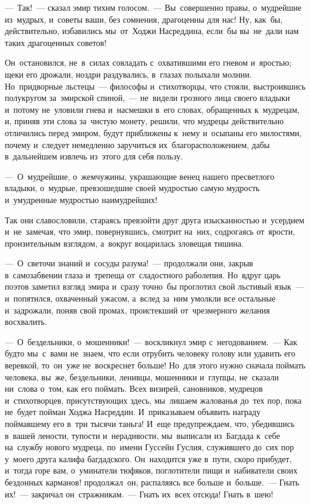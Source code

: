 \documentclass[12pt,a4paper]{book}
\begin{document}
—~Так!~— сказал эмир тихим голосом.~— Вы~совершенно правы, о~мудрейшие из~мудрых, и~советы ваши, без сомнения, драгоценны для нас! Ну, как~бы, действительно, избавились мы~от~Ходжи Насреддина, если~бы вы~не~дали нам таких драгоценных советов!

Он~остановился, не~в~силах совладать с~охватившими его гневом и~яростью; щеки его дрожали, ноздри раздувались, в~глазах полыхали молнии. Но~придворные льстецы~— философы и~стихотворцы, что стояли, выстроившись полукругом за~эмирской спиной,~— не~видели грозного лица своего владыки и~потому не~уловили гнева и~насмешки в~его словах, обращенных к~мудрецам, и, приняв эти слова за~чистую монету, решили, что мудрецы действительно отличились перед эмиром, будут приближены к~нему и~осыпаны его милостями, почему и~следует немедленно заручиться их~благорасположением, дабы в~дальнейшем извлечь из~этого для себя пользу.

—~О~мудрейшие, о~жемчужины, украшающие венец нашего пресветлого владыки, о~мудрые, превзошедшие своей мудростью самую мудрость и~умудренные мудростью наимудрейших!

Так они славословили, стараясь превзойти друг друга изысканностью и~усердием и~не~замечая, что эмир, повернувшись, смотрит на~них, содрогаясь от~ярости, пронзительным взглядом, а~вокруг воцарилась зловещая тишина.

—~О~светочи знаний и~сосуды разума!~— продолжали они, закрыв в~самозабвении глаза и~трепеща от~сладостного раболепия. Но~вдруг царь поэтов заметил взгляд эмира и~сразу точно~бы проглотил свой льстивый язык~— и~попятился, охваченный ужасом, а~вслед за~ним умолкли все остальные и~задрожали, поняв свой промах, проистекший от~чрезмерного желания восхвалить.

—~О~бездельники, о~мошенники!~— воскликнул эмир с~негодованием.~— Как будто мы~с~вами не~знаем, что если отрубить человеку голову или удавить его веревкой, то~он~уже не~воскреснет больше! Но~для этого нужно сначала поймать человека, вы~же, бездельники, ленивцы, мошенники и~глупцы, не~сказали ни~слова о~том, как его поймать. Всех визирей, сановников, мудрецов и~стихотворцев, присутствующих здесь, мы~лишаем жалованья до~тех пор, пока не~будет пойман Ходжа Насреддин. И~приказываем объявить награду поймавшему его в~три тысячи таньга! И~еще предупреждаем, что, убедившись в~вашей лености, тупости и~нерадивости, мы~выписали из~Багдада к~себе на~службу нового мудреца, по~имени Гуссейн Гуслия, служившего до~сих пор у~моего друга калифа багдадского. Он~находится уже в~пути, скоро прибудет, и~тогда горе вам, о~уминатели тюфяков, поглотители пищи и~набиватели своих бездонных карманов! продолжал~он, распаляясь все больше и~больше.~— Гнать их!~— закричал он~стражникам.~— Гнать их~всех отсюда! Гнать в~шею!
\end{document}
